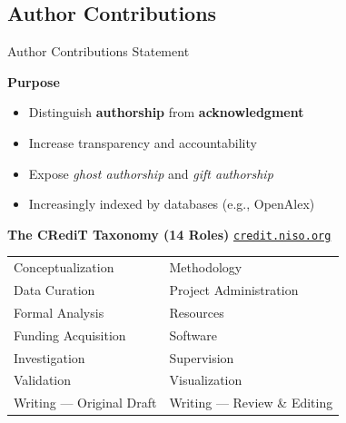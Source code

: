 \documentclass{beamer}
\begin{document}
\subsection{Author Contributions}

\begin{frame}{Author Contributions Statement}

  \textbf{Purpose}
  \smallskip
  \begin{itemize}
    \item Distinguish \textbf{authorship} from \textbf{acknowledgment}
    \item Increase transparency and accountability
    \item Expose \emph{ghost authorship} and \emph{gift authorship}
    \item Increasingly indexed by databases (e.g., OpenAlex)
  \end{itemize}

  \medskip
  \textbf{The CRediT Taxonomy (14 Roles)} \href{https://credit.niso.org}{\texttt{credit.niso.org}}
  \begin{center}
  {\footnotesize
  \begin{tabular}{@{}ll@{}}
    \hline
    Conceptualization     & Methodology \\
    Data Curation         & Project Administration \\
    Formal Analysis       & Resources \\
    Funding Acquisition   & Software \\
    Investigation         & Supervision \\
    Validation            & Visualization \\
    Writing --- Original Draft & Writing --- Review \& Editing \\
    \hline
  \end{tabular}
  }
\end{center}

\end{frame}
\end{document}
